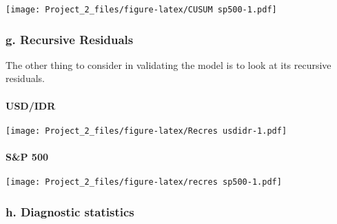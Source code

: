 \documentclass[]{article}
\newenvironment{Shaded}{\begin{snugshade}}{\end{snugshade}}
\newcommand{\KeywordTok}[1]{\textcolor[rgb]{0.13,0.29,0.53}{\textbf{#1}}}
\newcommand{\DataTypeTok}[1]{\textcolor[rgb]{0.13,0.29,0.53}{#1}}
\newcommand{\DecValTok}[1]{\textcolor[rgb]{0.00,0.00,0.81}{#1}}
\newcommand{\StringTok}[1]{\textcolor[rgb]{0.31,0.60,0.02}{#1}}
\newcommand{\OperatorTok}[1]{\textcolor[rgb]{0.81,0.36,0.00}{\textbf{#1}}}
\newcommand{\NormalTok}[1]{#1}
\let\oldparagraph\paragraph
\renewcommand{\paragraph}[1]{\oldparagraph{#1}\mbox{}}
\begin{document}
\texttt{[image: Project\_2\_files/figure-latex/CUSUM sp500-1.pdf]}

\subsubsection{g. Recursive Residuals}\label{g.-recursive-residuals}

The other thing to consider in validating the model is to look at its
recursive residuals.

\paragraph{USD/IDR}\label{usdidr-1}

\begin{Shaded}
\end{Shaded}

\texttt{[image: Project\_2\_files/figure-latex/Recres usdidr-1.pdf]}

\paragraph{S\&P 500}\label{sp-500-1}

\begin{Shaded}
\end{Shaded}

\texttt{[image: Project\_2\_files/figure-latex/recres sp500-1.pdf]}

\subsubsection{h. Diagnostic statistics}\label{h.-diagnostic-statistics}
\end{document}
